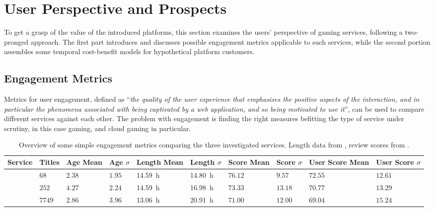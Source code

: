 \section{User Perspective and Prospects}
\label{sec:engagement}

To get a grasp of the value of the introduced platforms, this section examines the users' perspective of gaming services, following a two-pronged approach. The first part introduces and discusses possible engagement metrics applicable to such services, while the second portion assembles some temporal cost-benefit models for hypothetical platform customers.


\subsection{Engagement Metrics}

Metrics for user engagement, defined as ``\textit{the quality of the user experience that emphasises the positive aspects of the interaction, and in particular the phenomena associated with being captivated by a web application, and so being motivated to use it}''\cite{Lehmann2012}, can be used to compare different services against each other. The problem with engagement is finding the right measures befitting the type of service under scrutiny, in this case gaming, and cloud gaming in particular.

\begin{table}
\centering
\caption{Overview of some simple engagement metrics comparing the three investigated services. Length data from \hltb, review scores from \metacritic.}
\label{tab:basic-engagement}
	\begin{tabu}{X[1.5]|X[r]X[r]X[r]X[r]X[r]X[r]X[r]X[r]X[r]}
	\toprule
	Service & Titles & Age Mean & Age $\sigma$ & Length Mean & Length $\sigma$ & Score Mean & Score $\sigma$ & User Score Mean & User Score $\sigma$\\
	\midrule
	\gfnow & $68$ & $2.38$ & $1.95$ & \SI{14.59}{\hour} & \SI{14.80}{\hour} & $76.12$ & $9.57$ & $72.55$ & $12.61$\\
	\psnow & $252$ & $4.27$ & $2.24$ & \SI{14.59}{\hour} & \SI{16.98}{\hour} & $73.33$ & $13.18$ & $70.77$ & $13.29$\\
	\steam & $7749$ & $2.86$ & $3.96$ & \SI{13.06}{\hour} & \SI{20.91}{\hour} & $71.00$ & $12.00$ & $69.04$ & $15.24$\\
	\bottomrule
	\end{tabu}
\end{table}

